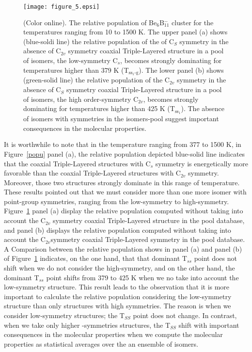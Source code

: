 \documentclass[prb,aps,preprint,showkeys,showpacs]{revtex4}
\begin{document}
\begin{figure}[ht!]
  \begin{center}
  \texttt{[image: figure\_5.epsi]}
    \caption{(Color online). The relative population of Be$_6$B$_{11}^{-}$ cluster for the temperatures ranging from 10 to 1500 K. The upper panel (a) shows (blue-soldi line) the relative population of the  of C$_{S}$ symmetry in the absence of C$_{2v}$ symmetry coaxial Triple-Layered structure in a pool of isomers, the low-symmetry  C$_s$, becomes strongly dominating for temperatures higher than 379 K ({\large{T$_{\textrm{ss$_1$-g}}$}}). The lower panel (b) shows (green-solid line) the relative population of the C$_{2v}$ symmetry in the absence of C$_{S}$ symmetry coaxial Triple-Layered structure in a pool of isomers, the high order-symmetry  C$_{2v}$, becomes strongly dominating for temperatures higher than 425 K ({\large{T$_{\textrm{ss$_1$}}$}}).  The absence of isomers with symmetries in the isomers-pool suggest important consequences in the molecular properties.}
    \label{popuSinC2v}
  \end{center}
  \end{figure}
It is worthwhile to note that in the temperature ranging from 377 to 1500 K, in Figure~\ref{popu} panel (a), the relative population depicted blue-solid line indicates that the coaxial Triple-Layered structures with C$_s$ symmetry is energetically more favorable than the coaxial Triple-Layered structures with C$_{2v}$ symmetry. Moreover, those two structures strongly dominate in this range of temperature. These results pointed out that we must consider more than one more isomer with point-group symmetries, ranging from the low-symmetry to high-symmetry. Figure~\ref{popuSinC2v} panel (a) display the relative population computed without taking into account the C$_{2v}$ symmetry coaxial Triple-Layered structure in the pool database, and panel (b) displays the relative population computed without taking into account the C$_{2v}$symmetry coaxial Triple-Layered symmetry in the pool database. A Comparison between the relative population shows in panel (a) and panel (b)    of  Figure~\ref{popuSinC2v} indicates, on the one hand, that that dominant T$_{ss}$ point does not shift when we do not consider the high-symmetry,   and on the other hand, the dominant T$_{ss}$ point shifts from 379 to 425 K when we no take into account the low-symmetry structure. This result leads to the observation that it is more important to calculate the relative population considering the low-symmetry structure than only structures with high symmetries. The reason is when we consider low-symmetry structures; the T$_{SS}$ point does not change. In contrast, when we take only higher -symmetries structures, the T$_{SS}$ shift with important consequences in the molecular properties when we compute the molecular properties as  statistical averages over the an ensemble of isomers.
\end{document}

